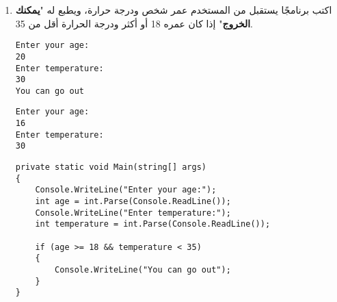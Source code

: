 \documentclass[12pt, twoside]{article}
\begin{document}
\begin{enumerate}[itemsep=3em]
\begin{enumerate}

\item
اكتب برنامجًا يستقبل من المستخدم عمر شخص ودرجة حرارة، ويطبع له "\textbf{يمكنك الخروج}" إذا كان عمره 18 أو أكثر ودرجة الحرارة أقل من 35.
\ifdetailed
\begin{example}[1]
\begin{english}
\begin{verbatim}
Enter your age:
20
Enter temperature:
30
You can go out
\end{verbatim}
\end{english}
\end{example}
\begin{example}[2]
\begin{english}
\begin{verbatim}
Enter your age:
16
Enter temperature:
30
\end{verbatim}
\end{english}
\end{example}

\ifwithsols
\begin{solution}
\begin{english}
\begin{verbatim}
private static void Main(string[] args)
{
    Console.WriteLine("Enter your age:");
    int age = int.Parse(Console.ReadLine());
    Console.WriteLine("Enter temperature:");
    int temperature = int.Parse(Console.ReadLine());

    if (age >= 18 && temperature < 35)
    {
        Console.WriteLine("You can go out");
    }
}
\end{verbatim}
\end{english}
\end{solution}
\clearpage
\fi
\fi


\end{enumerate}
\end{enumerate}
\end{document}
